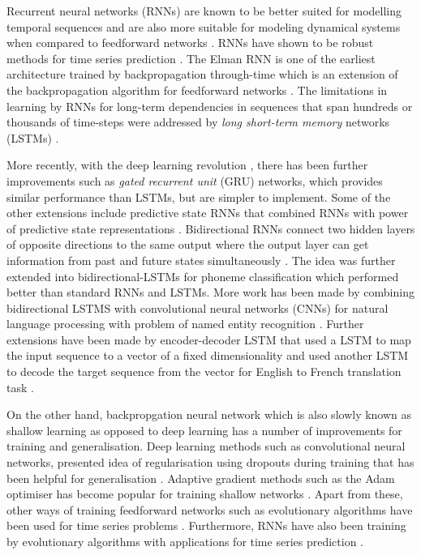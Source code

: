 \documentclass[final,5p,times,twocolumn]{elsarticle}
\begin{document}
Recurrent neural networks (RNNs) are known to be better suited for  modelling temporal sequences  \cite{elman_Zipser1988,Werbos_1990,hochreiter1997long,schmidhuber2015deep} and are also   more suitable  for modeling dynamical systems when compared to feedforward networks  \cite{Omlin_thonberetal1996, Omlin_Giles1992,Giles_etal1999}.  RNNs have shown  to be robust methods for time series prediction \cite{connor1994recurrent}.   The Elman RNN \cite{elman_Zipser1988,Elman_1990} is one of the earliest architecture trained by backpropagation through-time which is an extension of  the backpropagation algorithm for feedforward networks \cite{Werbos_1990}. The limitations in   learning by RNNs for long-term dependencies in sequences   that span hundreds or thousands of time-steps  \cite{hochreiter1998vanishing,bengio1994learning} were addressed by  \textit{long short-term memory} networks (LSTMs)   \cite{hochreiter1997long}.

More recently, with the deep learning revolution \cite{schmidhuber2015deep}, there has been further improvements   such as \textit{gated recurrent unit} (GRU)  \cite{chung2014empirical,cho2014learning} networks, which provides similar performance than LSTMs, but are simpler to implement. Some of the other extensions include  predictive state  RNNs \cite{downey2017predictive} that combined RNNs with  power  of predictive state representations \cite{singh2004predictive}.  Bidirectional RNNs connect two hidden layers of opposite directions to the same output where the output layer can get information from past   and future  states simultaneously \cite{schuster1997bidirectional}. The idea was further extended into bidirectional-LSTMs for phoneme classification \cite{graves2005framewise} which performed better than standard RNNs and LSTMs. More work has been made by combining bidirectional LSTMS with convolutional neural networks (CNNs) for natural language processing with problem of named entity recognition \cite{chiu2016named}. Further extensions have been made by encoder-decoder LSTM that used a LSTM to map the input sequence to a vector of a fixed dimensionality and used another LSTM to decode the target sequence from the vector for English to French translation task \cite{sutskever2014sequence}.


On the other hand, backpropgation neural network  which is  also slowly known as shallow learning as opposed to deep learning has a number of improvements for training and generalisation. Deep learning methods such as convolutional neural networks, presented idea of regularisation using dropouts during training that has been helpful for generalisation \cite{srivastava2014dropout}. Adaptive gradient methods such as the Adam optimiser has become popular for training shallow networks \cite{Adams2017}. Apart from these, other ways of training feedforward networks such as evolutionary algorithms have been used for time series problems \cite{Chandra2018NC-CMTL,chandra2018co}.
Furthermore, RNNs have also been training by evolutionary algorithms with applications for time series prediction \cite{cai2007time,Chandra2012times}.
\end{document}
